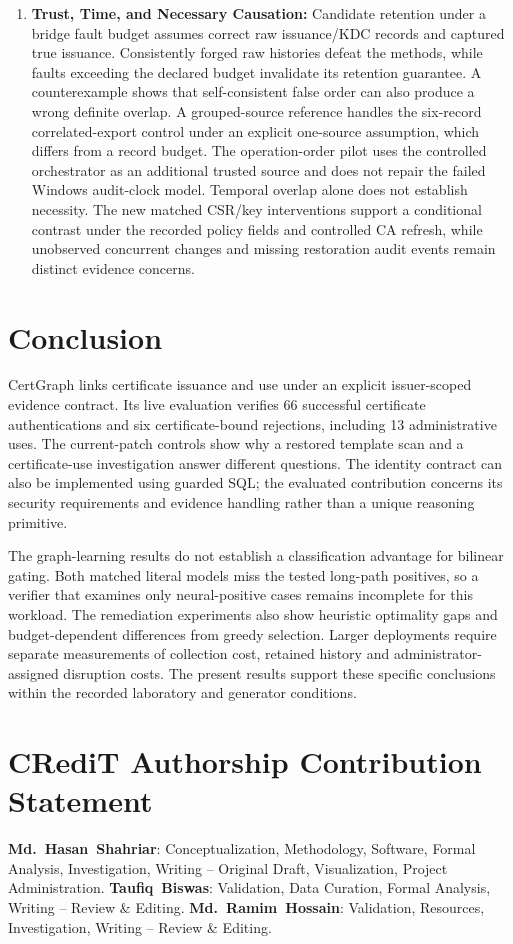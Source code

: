 \begin{enumerate}
    \item \textbf{Trust, Time, and Necessary Causation:} Candidate retention under a bridge fault budget assumes correct raw issuance/KDC records and captured true issuance. Consistently forged raw histories defeat the methods, while faults exceeding the declared budget invalidate its retention guarantee. A counterexample shows that self-consistent false order can also produce a wrong definite overlap. A grouped-source reference handles the six-record correlated-export control under an explicit one-source assumption, which differs from a record budget. The operation-order pilot uses the controlled orchestrator as an additional trusted source and does not repair the failed Windows audit-clock model. Temporal overlap alone does not establish necessity. The new matched CSR/key interventions support a conditional contrast under the recorded policy fields and controlled CA refresh, while unobserved concurrent changes and missing restoration audit events remain distinct evidence concerns.
\end{enumerate}

\section{Conclusion}
\label{sec:conclusion}
CertGraph links certificate issuance and use under an explicit issuer-scoped evidence contract. Its live evaluation verifies 66 successful certificate authentications and six certificate-bound rejections, including 13 administrative uses. The current-patch controls show why a restored template scan and a certificate-use investigation answer different questions. The identity contract can also be implemented using guarded SQL; the evaluated contribution concerns its security requirements and evidence handling rather than a unique reasoning primitive.

The graph-learning results do not establish a classification advantage for bilinear gating. Both matched literal models miss the tested long-path positives, so a verifier that examines only neural-positive cases remains incomplete for this workload. The remediation experiments also show heuristic optimality gaps and budget-dependent differences from greedy selection. Larger deployments require separate measurements of collection cost, retained history and administrator-assigned disruption costs. The present results support these specific conclusions within the recorded laboratory and generator conditions.

\section*{CRediT Authorship Contribution Statement}
\noindent\textbf{Md.~Hasan~Shahriar}: Conceptualization, Methodology, Software, Formal Analysis, Investigation, Writing -- Original Draft, Visualization, Project Administration.
\textbf{Taufiq~Biswas}: Validation, Data Curation, Formal Analysis, Writing -- Review \& Editing.
\textbf{Md.~Ramim~Hossain}: Validation, Resources, Investigation, Writing -- Review \& Editing.

